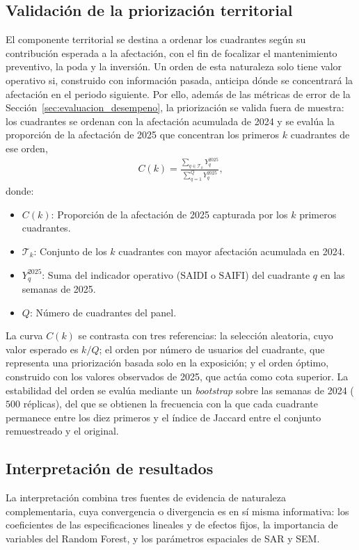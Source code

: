 \subsection{Validación de la priorización territorial}
\label{sec:validacion_priorizacion}
El componente territorial se destina a ordenar los cuadrantes según su contribución esperada a la afectación, con el fin de focalizar el mantenimiento preventivo, la poda y la inversión. Un orden de esta naturaleza solo tiene valor operativo si, construido con información pasada, anticipa dónde se concentrará la afectación en el periodo siguiente. Por ello, además de las métricas de error de la Sección~\ref{sec:evaluacion_desempeno}, la priorización se valida fuera de muestra: los cuadrantes se ordenan con la afectación acumulada de 2024 y se evalúa la proporción de la afectación de 2025 que concentran los primeros $k$ cuadrantes de ese orden,
\begin{equation}
    \begin{aligned}
    C(k) = \frac{\sum_{q \in \mathcal{T}_k} Y_{q}^{2025}}{\sum_{q=1}^{Q} Y_{q}^{2025}},
    \end{aligned}
    \label{eq:curva_captura}
\end{equation}
donde:
\begin{itemize}
    \item $C(k)$: Proporción de la afectación de 2025 capturada por los $k$ primeros cuadrantes.
    \item $\mathcal{T}_k$: Conjunto de los $k$ cuadrantes con mayor afectación acumulada en 2024.
    \item $Y_{q}^{2025}$: Suma del indicador operativo ($\mathrm{SAIDI}$ o $\mathrm{SAIFI}$) del cuadrante $q$ en las semanas de 2025.
    \item $Q$: Número de cuadrantes del panel.
\end{itemize}
La curva $C(k)$ se contrasta con tres referencias: la selección aleatoria, cuyo valor esperado es $k/Q$; el orden por número de usuarios del cuadrante, que representa una priorización basada solo en la exposición; y el orden óptimo, construido con los valores observados de 2025, que actúa como cota superior. La estabilidad del orden se evalúa mediante un \emph{bootstrap} sobre las semanas de 2024 ($500$ réplicas), del que se obtienen la frecuencia con la que cada cuadrante permanece entre los diez primeros y el índice de Jaccard entre el conjunto remuestreado y el original.

\subsection{Interpretación de resultados}
\label{sec:interpretacion_resultados_etapa5}
La interpretación combina tres fuentes de evidencia de naturaleza complementaria, cuya convergencia o divergencia es en sí misma informativa: los coeficientes de las especificaciones lineales y de efectos fijos, la importancia de variables del Random Forest, y los parámetros espaciales de SAR y SEM.

